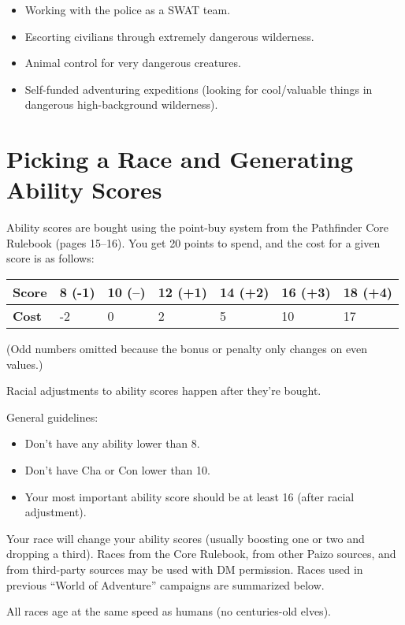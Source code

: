 \begin{itemize}
%
\item Working with the police as a SWAT team.
%
\item Escorting civilians through extremely dangerous wilderness.
%
\item Animal control for very dangerous creatures.
%
\item Self-funded adventuring expeditions (looking for cool/valuable things
in dangerous high-background wilderness).
%
\end{itemize}

%
%
\section{Picking a Race and Generating Ability Scores}

Ability scores are bought using the point-buy system from the Pathfinder
Core Rulebook (pages 15--16). You get 20 points to spend, and the cost for
a given score is as follows:

\begin{tabular}{|l||l|l|l|l|l|l|}\hline
\textbf{Score} & 8 (-1) & 10 (--) & 12 (+1) & 14 (+2) & 16 (+3) & 18 (+4) \\
\hline
\textbf{Cost} & -2 & 0 & 2 & 5 & 10 & 17 \\
\hline
\end{tabular}

(Odd numbers omitted because the bonus or penalty only changes on even
values.)

Racial adjustments to ability scores happen after they're bought.

General guidelines:
\begin{itemize}
\item Don't have any ability lower than 8.
\item Don't have Cha or Con lower than 10.
\item Your most important ability score should be at least 16 (after racial
adjustment).
\end{itemize}

Your race will change your ability scores (usually boosting one or two and
dropping a third). Races from the Core Rulebook, from other Paizo sources,
and from third-party sources may be used with DM permission. Races used
in previous ``World of Adventure'' campaigns are summarized below.

All races age at the same speed as humans (no centuries-old elves).

